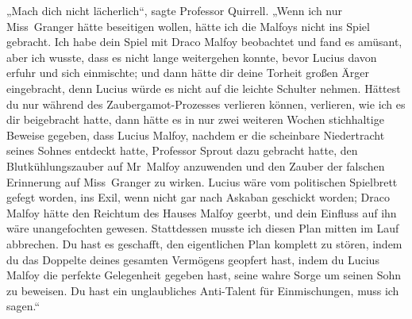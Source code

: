 „Mach dich nicht lächerlich“, sagte Professor Quirrell.
„Wenn ich nur Miss~Granger hätte beseitigen wollen, hätte ich die Malfoys nicht ins Spiel gebracht. Ich habe dein Spiel mit Draco Malfoy beobachtet und fand es amüsant, aber ich wusste, dass es nicht lange weitergehen konnte, bevor Lucius davon erfuhr und sich einmischte; und dann hätte dir deine Torheit großen Ärger eingebracht, denn Lucius würde es nicht auf die leichte Schulter nehmen. Hättest du nur während des Zaubergamot-Prozesses verlieren können, verlieren, wie ich es dir beigebracht hatte, dann hätte es in nur zwei weiteren Wochen stichhaltige Beweise gegeben, dass Lucius Malfoy, nachdem er die scheinbare Niedertracht seines Sohnes entdeckt hatte, Professor Sprout dazu gebracht hatte, den Blutkühlungszauber auf Mr~Malfoy anzuwenden und den Zauber der falschen Erinnerung auf Miss~Granger zu wirken. Lucius wäre vom politischen Spielbrett gefegt worden, ins Exil, wenn nicht gar nach Askaban geschickt worden; Draco Malfoy hätte den Reichtum des Hauses Malfoy geerbt, und dein Einfluss auf ihn wäre unangefochten gewesen. Stattdessen musste ich diesen Plan mitten im Lauf abbrechen. Du hast es geschafft, den eigentlichen Plan komplett zu stören, indem du das Doppelte deines gesamten Vermögens geopfert hast, indem du Lucius Malfoy die perfekte Gelegenheit gegeben hast, seine wahre Sorge um seinen Sohn zu beweisen. Du hast ein unglaubliches Anti-Talent für Einmischungen, muss ich sagen.“

